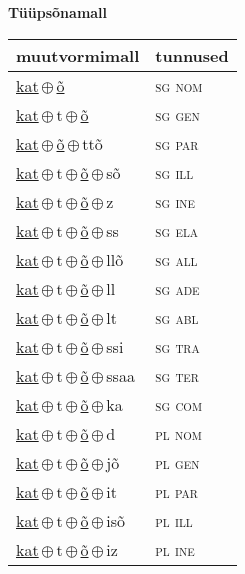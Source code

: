 

\vspace{3.5em}
\noindent \begin{minipage}{\textwidth}
\noindent \textbf{Tüüpsõnamall \,}\\

\begin{sideways}
\begin{tabular}{l l}
muutvormimall & tunnused \\
\hline
\underline{kat}\,$\oplus$\,\underline{õ} & \textsc{ sg nom } \\
\underline{kat}\,$\oplus$\,t\,$\oplus$\,\underline{õ} & \textsc{ sg gen } \\
\underline{kat}\,$\oplus$\,\underline{õ}\,$\oplus$\,ttõ & \textsc{ sg par } \\
\underline{kat}\,$\oplus$\,t\,$\oplus$\,\underline{õ}\,$\oplus$\,sõ & \textsc{ sg ill } \\
\underline{kat}\,$\oplus$\,t\,$\oplus$\,\underline{õ}\,$\oplus$\,z & \textsc{ sg ine } \\
\underline{kat}\,$\oplus$\,t\,$\oplus$\,\underline{õ}\,$\oplus$\,ss & \textsc{ sg ela } \\
\underline{kat}\,$\oplus$\,t\,$\oplus$\,\underline{õ}\,$\oplus$\,llõ & \textsc{ sg all } \\
\underline{kat}\,$\oplus$\,t\,$\oplus$\,\underline{õ}\,$\oplus$\,ll & \textsc{ sg ade } \\
\underline{kat}\,$\oplus$\,t\,$\oplus$\,\underline{õ}\,$\oplus$\,lt & \textsc{ sg abl } \\
\underline{kat}\,$\oplus$\,t\,$\oplus$\,\underline{õ}\,$\oplus$\,ssi & \textsc{ sg tra } \\
\underline{kat}\,$\oplus$\,t\,$\oplus$\,\underline{õ}\,$\oplus$\,ssaa & \textsc{ sg ter } \\
\underline{kat}\,$\oplus$\,t\,$\oplus$\,\underline{õ}\,$\oplus$\,ka & \textsc{ sg com } \\
\underline{kat}\,$\oplus$\,t\,$\oplus$\,\underline{õ}\,$\oplus$\,d & \textsc{ pl nom } \\
\underline{kat}\,$\oplus$\,t\,$\oplus$\,\underline{õ}\,$\oplus$\,jõ & \textsc{ pl gen } \\
\underline{kat}\,$\oplus$\,t\,$\oplus$\,\underline{õ}\,$\oplus$\,it & \textsc{ pl par } \\
\underline{kat}\,$\oplus$\,t\,$\oplus$\,\underline{õ}\,$\oplus$\,isõ & \textsc{ pl ill } \\
\underline{kat}\,$\oplus$\,t\,$\oplus$\,\underline{õ}\,$\oplus$\,iz & \textsc{ pl ine } \\

\end{tabular}
\end{sideways}
\end{minipage}
